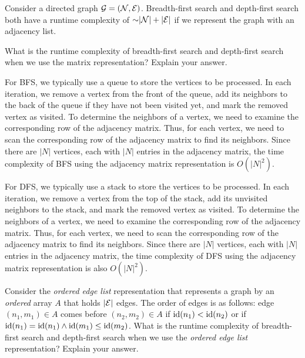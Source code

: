 


\maketitle
\DEFAULTMSG{}

\begin{problem}
Consider a directed graph $\mathcal{G} = (\mathcal{N}, \mathcal{E})$. Breadth-first search and depth-first search both have a runtime complexity of $\mathord{\sim}\lvert \mathcal{N} \rvert + \lvert \mathcal{E} \rvert$ if we represent the graph with an adjacency list.
\begin{questions}
\item What is the runtime complexity of breadth-first search and depth-first search when we use the matrix representation? Explain your answer.

For BFS, we typically use a queue to store the vertices to be 
processed. In each iteration, we remove a vertex from the front 
of the queue, add its neighbors to the back of the queue if they 
have not been visited yet, and mark the removed vertex as visited.
 To determine the neighbors of a vertex, we need to examine the
  corresponding row of the adjacency matrix. Thus, for each 
  vertex, we need to scan the corresponding row of the adjacency
   matrix to find its neighbors. Since there are $|N|$ vertices, 
   each with $|N|$ entries in the adjacency matrix, the time 
   complexity of BFS using the adjacency matrix representation 
   is $O(|N|^2)$.

For DFS, we typically use a stack to store the vertices to 
be processed. In each iteration, we remove a vertex from the 
top of the stack, add its unvisited neighbors to the stack, and 
mark the removed vertex as visited. To determine the neighbors 
of a vertex, we need to examine the corresponding row of the 
adjacency matrix. Thus, for each vertex, we need to scan the 
corresponding row of the adjacency matrix to find its neighbors. 
Since there are $|N|$ vertices, each with $|N|$ entries in the
 adjacency matrix, the time complexity of DFS using the adjacency 
 matrix representation is also $O(|N|^2)$.

\item Consider the \emph{ordered edge list} representation that represents a graph by an \emph{ordered} array $A$ that holds $\lvert \mathcal{E} \rvert$ edges. The order of edges is as follows: edge $(n_1, m_1) \in A$ comes before $(n_2, m_2) \in A$ if $\operatorname{id}(n_1) < \operatorname{id}(n_2)$ or if $\operatorname{id}(n_1) = \operatorname{id}(n_1) \land \operatorname{id}(m_1) \leq \operatorname{id}(m_2)$. What is the runtime complexity of breadth-first search and depth-first search when we use the \emph{ordered edge list} representation? Explain your answer.



\end{questions}
\end{problem}
